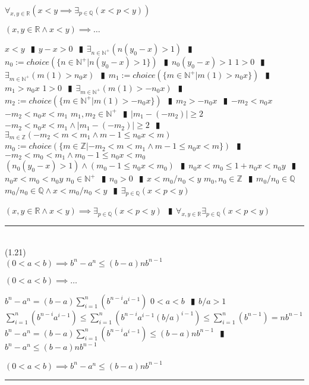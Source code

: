 \documentclass{book}
\newcommand{\wff}[1]{\hypertarget{#1}{\fbox{\textcolor{red}{$#1$}}\phantom{--}}}
\newcommand{\abr}{:=}
\newcommand{\pipe}{$\phantom{(}\vrectangleblack\phantom{)}$}
\newcommand{\pr}[1]{\left(#1\right)}
\begin{document}
\wff{QDenseInR} $\forall_{x, y \in \mathbb{R}}\pr{x < y \implies \exists_{p \in \mathbb{Q}}(x < p < y)}$
\begin{enumerate}
  \lit $(x, y \in \mathbb{R} \land x < y) \implies \ldots$
  \begin{enumerate}
    \lit $x < y$ \pipe $y - x > 0$ \pipe $\exists_{n \in \mathbb{N}^+}(n (y_0 - x) > 1)$ \pipe $n_0 \abr choice(\{n \in \mathbb{N}^+ | n (y_0 - x) > 1\})$ \pipe $n_0 (y_0 - x) > 1$
    \lit $1 > 0$ \pipe $\exists_{m \in \mathbb{N}^+}(m (1) > n_0 x)$ \pipe $m_1 \abr choice(\{m \in \mathbb{N}^+ | m (1) > n_0 x\})$ \pipe $m_1 > n_0 x$
    \lit $1 > 0$ \pipe $\exists_{m \in \mathbb{N}^+}(m (1) > -n_0 x)$ \pipe $m_2 \abr choice(\{m \in \mathbb{N}^+ | m (1) > -n_0 x\})$ \pipe $m_2 > -n_0 x$ \pipe $-m_2 < n_0 x$
    \lit $-m_2 < n_0 x < m_1$
    \lit $m_1, m_2 \in \mathbb{N}^+$ \pipe $|m_1 - (-m_2)| \geq 2$
    \lit $-m_2 < n_0 x < m_1 \land |m_1 - (-m_2)| \geq 2$ \pipe $\exists_{m \in \mathbb{Z}}(-m_2 < m < m_1 \land m - 1 \leq n_0 x < m)$
    \lit $m_0 \abr choice(\{m \in \mathbb{Z} | -m_2 < m < m_1 \land m - 1 \leq n_0 x < m\})$ \pipe $-m_2 < m_0 < m_1 \land m_0 - 1 \leq n_0 x < m_0$
    \lit $(n_0 (y_0 - x) > 1) \land (m_0 - 1 \leq n_0 x < m_0)$ \pipe $n_0 x < m_0 \leq 1 + n_0 x < n_0 y$ \pipe $n_0 x < m_0 < n_0 y$
    \lit $n_0 \in \mathbb{N}^+$ \pipe $n_0 > 0$ \pipe $x < m_0 / n_0 < y$
    \lit $m_0, n_0 \in \mathbb{Z}$ \pipe $m_0 / n_0 \in \mathbb{Q}$
    \lit $m_0 / n_0 \in \mathbb{Q} \land x < m_0 / n_0 < y$ \pipe $\exists_{p \in \mathbb{Q}}(x < p < y)$
  \end{enumerate}
  \lit $(x, y \in \mathbb{R} \land x < y) \implies \exists_{p \in \mathbb{Q}}(x < p < y)$ \pipe $\forall_{x, y \in \mathbb{R}} \exists_{p \in \mathbb{Q}}(x < p < y)$
\end{enumerate} \vspace{.75mm} \hrule \vspace{.75mm} \ \\ 

(1.21) \\
\wff{RootExistenceInRLemma} $(0 < a < b) \implies b^n - a^n \leq (b - a) n b^{n - 1}$
\begin{enumerate}
  \lit $(0 < a < b) \implies \ldots$
  \begin{enumerate}
    \lit $b^n - a^n = (b - a) \sum_{i = 1}^{n}(b^{n - i} a^{i - 1})$
    \lit $0 < a < b$ \pipe $b/a > 1$
    \lit $\sum_{i = 1}^{n}(b^{n - i} a^{i - 1}) \leq \sum_{i = 1}^{n}(b^{n - i} a^{i - 1} (b / a)^{i - 1}) \leq \sum_{i = 1}^{n}(b^{n - 1}) = n b^{n - 1}$
    \lit $b^n - a^n = (b - a) \sum_{i = 1}^{n}(b^{n - i} a^{i - 1}) \leq (b - a) n b^{n - 1}$ \pipe $b^n - a^n \leq (b - a) n b^{n - 1}$
  \end{enumerate}
  \lit $(0 < a < b) \implies b^n - a^n \leq (b - a) n b^{n - 1}$
\end{enumerate} \vspace{.75mm} \hrule \vspace{.75mm} \ \\ 
\end{document}

